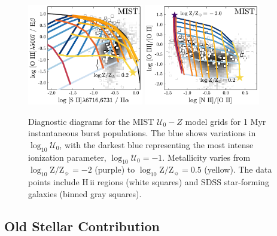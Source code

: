 \documentclass[linenumbers, trackchanges, tighten]{aastex61}%
\newcommand{\logten}{\ensuremath{\log_{10}}}
\newcommand{\hii}{H\,{\sc ii}\xspace}
\newcommand{\logZeq}[1]{\ensuremath{\logten \mathrm{Z}/\mathrm{Z}_{\sun} = #1}}
\newcommand{\U}{\ensuremath{\mathcal{U}_{0}}}
\newcommand{\logU}{\ensuremath{\logten \mathcal{U}_0}}
\begin{document}
\begin{figure}[!htbp]
  \begin{centering}
    \includegraphics[width=0.45\textwidth]{f26a.pdf}
    \includegraphics[width=0.45\textwidth]{f26b.pdf}
    \caption{Diagnostic diagrams for the MIST $\U-Z$ model grids for 1 Myr instantaneous burst populations. The blue shows variations in \logU{}, with the darkest blue representing the most intense ionization parameter, $\logU{}=-1$. Metallicity varies from \logZeq{-2} (purple) to \logZeq{0.5} (yellow). The data points include \hii regions (white squares) and SDSS star-forming galaxies (binned gray squares).}
    \label{fig:MIST:altRatios}
  \end{centering}
\end{figure}



\subsection{Old Stellar Contribution}\label{sec:secondary:old}
\end{document}
